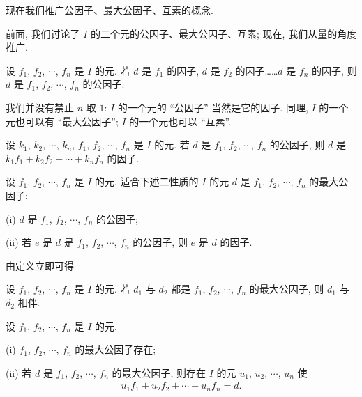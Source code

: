 现在我们推广公因子、最大公因子、互素的概念.

前面, 我们讨论了 $I$ 的二个元的公因子、最大公因子、互素; 现在, 我们从量的角度推广.

\begin{definition}
    设 $f_1$, $f_2$, $\cdots$, $f_n$ 是 $I$ 的元. 若 $d$ 是 $f_1$ 的因子, $d$ 是 $f_2$ 的因子……$d$ 是 $f_n$ 的因子, 则 $d$ 是 $f_1$, $f_2$, $\cdots$, $f_n$ 的公因子.
\end{definition}

\begin{remark}
    我们并没有禁止 $n$ 取 $1$: $I$ 的一个元的 ``公因子'' 当然是它的因子. 同理, $I$ 的一个元也可以有 ``最大公因子''; $I$ 的一个元也可以 ``互素''.
\end{remark}

\begin{proposition}
    设 $k_1$, $k_2$, $\cdots$, $k_n$, $f_1$, $f_2$, $\cdots$, $f_n$ 是 $I$ 的元. 若 $d$ 是 $f_1$, $f_2$, $\cdots$, $f_n$ 的公因子, 则 $d$ 是 $k_1 f_1 + k_2 f_2 + \cdots + k_n f_n$ 的因子.
\end{proposition}

\begin{definition}
    设 $f_1$, $f_2$, $\cdots$, $f_n$ 是 $I$ 的元. 适合下述二性质的 $I$ 的元 $d$ 是 $f_1$, $f_2$, $\cdots$, $f_n$ 的最大公因子:

    (i) $d$ 是 $f_1$, $f_2$, $\cdots$, $f_n$ 的公因子;

    (ii) 若 $e$ 是 $d$ 是 $f_1$, $f_2$, $\cdots$, $f_n$ 的公因子, 则 $e$ 是 $d$ 的因子.
\end{definition}

由定义立即可得
\begin{proposition}
    设 $f_1$, $f_2$, $\cdots$, $f_n$ 是 $I$ 的元. 若 $d_1$ 与 $d_2$ 都是 $f_1$, $f_2$, $\cdots$, $f_n$ 的最大公因子, 则 $d_1$ 与 $d_2$ 相伴.
\end{proposition}

\begin{proposition}
    设 $f_1$, $f_2$, $\cdots$, $f_n$ 是 $I$ 的元.

    (i) $f_1$, $f_2$, $\cdots$, $f_n$ 的最大公因子存在;

    (ii) 若 $d$ 是 $f_1$, $f_2$, $\cdots$, $f_n$ 的最大公因子, 则存在 $I$ 的元 $u_1$, $u_2$, $\cdots$, $u_n$ 使
    \begin{align*}
        u_1 f_1 + u_2 f_2 + \cdots + u_n f_n = d.
    \end{align*}
\end{proposition}

